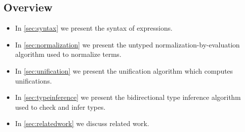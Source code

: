\subsection{Overview}

\begin{itemize}
    \item In \cref{sec:syntax} we present the syntax of expressions.
    \item In \cref{sec:normalization} we present the untyped normalization-by-evaluation algorithm used to normalize terms.
    \item In \cref{sec:unification} we present the unification algorithm which computes unifications.
    \item In \cref{sec:typeinference} we present the bidirectional type inference algorithm used to check and infer types.
    \item In \cref{sec:relatedwork} we discuss related work.
\end{itemize}